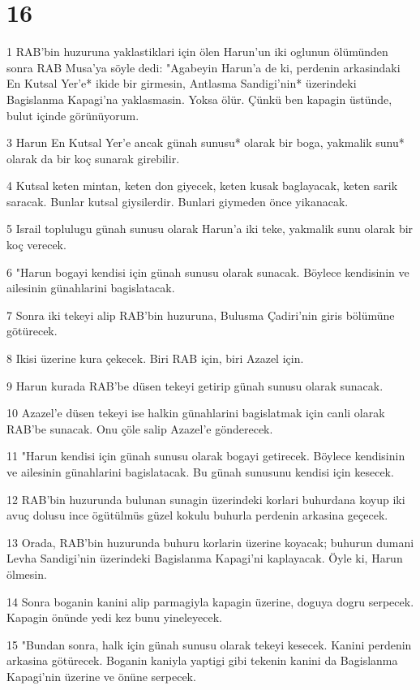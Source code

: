 \chapter{16}

\par 1 RAB'bin huzuruna yaklastiklari için ölen Harun'un iki oglunun ölümünden sonra RAB Musa'ya söyle dedi: "Agabeyin Harun'a de ki, perdenin arkasindaki En Kutsal Yer'e* ikide bir girmesin, Antlasma Sandigi'nin* üzerindeki Bagislanma Kapagi'na yaklasmasin. Yoksa ölür. Çünkü ben kapagin üstünde, bulut içinde görünüyorum.
\par 3 Harun En Kutsal Yer'e ancak günah sunusu* olarak bir boga, yakmalik sunu* olarak da bir koç sunarak girebilir.
\par 4 Kutsal keten mintan, keten don giyecek, keten kusak baglayacak, keten sarik saracak. Bunlar kutsal giysilerdir. Bunlari giymeden önce yikanacak.
\par 5 Israil toplulugu günah sunusu olarak Harun'a iki teke, yakmalik sunu olarak bir koç verecek.
\par 6 "Harun bogayi kendisi için günah sunusu olarak sunacak. Böylece kendisinin ve ailesinin günahlarini bagislatacak.
\par 7 Sonra iki tekeyi alip RAB'bin huzuruna, Bulusma Çadiri'nin giris bölümüne götürecek.
\par 8 Ikisi üzerine kura çekecek. Biri RAB için, biri Azazel için.
\par 9 Harun kurada RAB'be düsen tekeyi getirip günah sunusu olarak sunacak.
\par 10 Azazel'e düsen tekeyi ise halkin günahlarini bagislatmak için canli olarak RAB'be sunacak. Onu çöle salip Azazel'e gönderecek.
\par 11 "Harun kendisi için günah sunusu olarak bogayi getirecek. Böylece kendisinin ve ailesinin günahlarini bagislatacak. Bu günah sunusunu kendisi için kesecek.
\par 12 RAB'bin huzurunda bulunan sunagin üzerindeki korlari buhurdana koyup iki avuç dolusu ince ögütülmüs güzel kokulu buhurla perdenin arkasina geçecek.
\par 13 Orada, RAB'bin huzurunda buhuru korlarin üzerine koyacak; buhurun dumani Levha Sandigi'nin üzerindeki Bagislanma Kapagi'ni kaplayacak. Öyle ki, Harun ölmesin.
\par 14 Sonra boganin kanini alip parmagiyla kapagin üzerine, doguya dogru serpecek. Kapagin önünde yedi kez bunu yineleyecek.
\par 15 "Bundan sonra, halk için günah sunusu olarak tekeyi kesecek. Kanini perdenin arkasina götürecek. Boganin kaniyla yaptigi gibi tekenin kanini da Bagislanma Kapagi'nin üzerine ve önüne serpecek.
